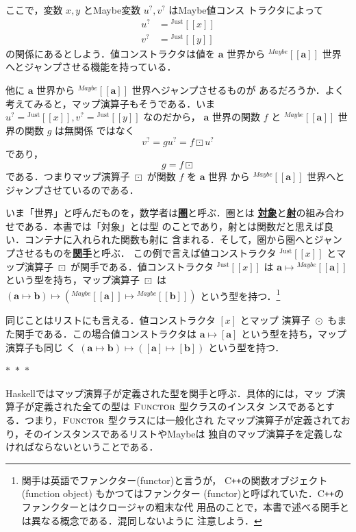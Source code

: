 \documentclass[a5paper,twoside,fleqn]{jsbook}
\def\[{\left[\!\left[}
\def\]{\right]\!\right]}
\newcommand{\separator}{\begin{center}$*$~$*$~$*$\end{center}}
\newcommand{\programminglanguage}[1]{\textsf{#1}}
\newcommand{\cxx}{\programminglanguage{C}\texttt{++}}
\newcommand{\haskell}{\programminglanguage{Haskell}}
\newcommand{\keyword}[1]{{\underline{\textbf{#1}}}}
\DeclareMathOperator{\mMapList}{\odot}
\DeclareMathOperator{\mMapMaybe}{\boxdot}
\DeclareMathOperator{\mMapsTo}{\mapsto}
\newcommand{\mType}[1]{\mathbf{#1}}
\newcommand{\mListType}[1]{[\mType{#1}]}
\newcommand{\mGenericTypeAssemble}[2]{{}^{\mTypeConstructor{#1}}\[\mType{#2}\]}
\newcommand{\mMaybeType}[1]{\mGenericTypeAssemble{Maybe}{#1}}
\newcommand{\mTypeConstructor}[1]{\textit{#1}}
\newcommand{\mGenericValueConstructor}[1]{\mathrm{#1}}
\newcommand{\mGenericWith}[2]{{}^\mGenericValueConstructor{#1}\[#2\]}
\newcommand{\mJustWith}[1]{\mGenericWith{Just}{#1}}
\newcommand{\mListWith}[1]{\left[#1\right]}
\newcommand{\mGenericTypeClass}[1]{\textsc{#1}} %
\newcommand{\mFunctorTypeClass}{\mGenericTypeClass{Functor}}
\newcommand{\mMaybe}[1]{{#1}^?}
\newcommand{\mProj}[2]{#1\mMapsTo#2}
\begin{document}
ここで，変数 $x,y$ とMaybe変数 $\mMaybe{u},\mMaybe{v}$ はMaybe値コンス
トラクタによって
\begin{align}
\mMaybe{u}&=\mJustWith{x}\\
\mMaybe{v}&=\mJustWith{y}
\end{align}
の関係にあるとしよう．値コンストラクタは値を $\mType{a}$ 世界から
$\mMaybeType{a}$ 世界へとジャンプさせる機能を持っている．

他に $\mType{a}$ 世界から $\mMaybeType{a}$ 世界へジャンプさせるものが
あるだろうか．よく考えてみると，マップ演算子もそうである．いま
$\mMaybe{u}=\mJustWith{x},\mMaybe{v}=\mJustWith{y}$ なのだから，
$\mType{a}$ 世界の関数 $f$ と $\mMaybeType{a}$ 世界の関数 $g$ は無関係
ではなく
\begin{equation}
\mMaybe{v}=g\mMaybe{u}=f\mMapMaybe\mMaybe{u}
\end{equation}
であり，
\begin{equation}
g=f\mMapMaybe
\end{equation}
である．つまりマップ演算子 $\mMapMaybe$ が関数 $f$ を $\mType{a}$ 世界
から $\mMaybeType{a}$ 世界へとジャンプさせているのである．

いま「世界」と呼んだものを，数学者は\keyword{圏}と呼ぶ．圏とは
\keyword{対象}と\keyword{射}の組み合わせである．本書では「対象」とは型
のことであり，射とは関数だと思えば良い．コンテナに入れられた関数も射に
含まれる．そして，圏から圏へとジャンプさせるものを\keyword{関手}と呼ぶ．
この例で言えば値コンストラクタ $\mJustWith{x}$ とマップ演算子
$\mMapMaybe$ が関手である．値コンストラクタ $\mJustWith{x}$ は
$\mProj{\mType{a}}{\mMaybeType{a}}$ という型を持ち，マップ演算子
$\mMapMaybe$ は
$\mProj{(\mProj{\mType{a}}{\mType{b}})}{(\mProj{\mMaybeType{a}}{\mMaybeType{b}})}$
という型を持つ．\footnote{関手は英語でファンクター(functor)と言うが，
\cxx の関数オブジェクト (function object) もかつてはファンクター
(functor)と呼ばれていた．\cxx のファンクターとはクロージャの粗末な代
用品のことで，本書で述べる関手とは異なる概念である．混同しないように
注意しよう．}

同じことはリストにも言える．値コンストラクタ $\mListWith{x}$ とマップ
演算子 $\mMapList$ もまた関手である．この場合値コンストラクタは
$\mProj{\mType{a}}{\mListType{a}}$ という型を持ち，マップ演算子も同じ
く
$\mProj{(\mProj{\mType{a}}{\mType{b}})}{(\mProj{\mListType{a}}{\mListType{b}})}$
という型を持つ．

\separator

\haskell ではマップ演算子が定義された型を関手と呼ぶ．具体的には，マッ
プ演算子が定義された全ての型は $\mFunctorTypeClass$ 型クラスのインスタ
ンスであるとする．つまり，$\mFunctorTypeClass$ 型クラスには一般化され
たマップ演算子が定義されており，そのインスタンスであるリストやMaybeは
独自のマップ演算子を定義しなければならないということである．
\end{document}
